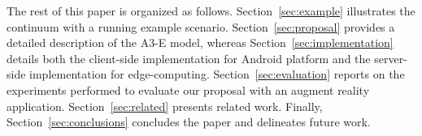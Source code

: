 The rest of this paper is organized as follows.  Section~\ref{sec:example} illustrates the continuum with a running example scenario. Section~\ref{sec:proposal} provides a detailed description of the A3-E model, whereas Section~\ref{sec:implementation} details both the client-side implementation for Android platform and the server-side implementation for edge-computing. Section~\ref{sec:evaluation} reports on the experiments performed to evaluate our proposal with an augment reality application. Section~\ref{sec:related} presents related work. Finally, Section~\ref{sec:conclusions} concludes the paper and delineates future work.

